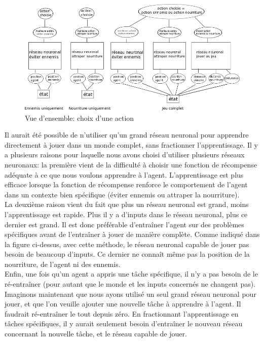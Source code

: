 \documentclass[11pt,a4paper]{report}
\begin{document}
   \begin{figure}[!h]
   \center
   \includegraphics[scale=0.6]{ressources/vue_ensemble_reseaux_agents.png}
   \caption{Vue d'ensemble: choix d'une action}
   \end{figure} 
  
  \par Il aurait été possible de n'utiliser qu'un grand réseau neuronal pour apprendre directement à jouer dans un monde complet, sans fractionner l'apprentissage. Il y a plusieurs raisons pour laquelle nous avons choisi d'utiliser plusieurs réseaux neuronaux: la première vient de la difficulté à choisir une fonction de récompense adéquate à ce que nous voulons apprendre à l'agent. L'apprentissage est plus efficace lorsque la fonction de récompense renforce le comportement de l'agent dans un contexte bien spécifique (éviter ennemis ou attraper la nourriture). \\
  La deuxième raison vient du fait que plus un réseau neuronal est grand, moins l'apprentissage est rapide. Plus il y a d'inputs dans le réseau neuronal, plus ce dernier est grand. Il est donc préférable d’entraîner l'agent sur des problèmes spécifiques avant de l’entraîner à jouer de manière complète. Comme indiqué dans la figure ci-dessus, avec cette méthode, le réseau neuronal capable de jouer pas besoin de beaucoup d'inputs. Ce dernier ne connaît même pas la position de la nourriture, de l'agent ni des ennemis. \\
  Enfin, une fois qu'un agent a appris une tâche spécifique, il n'y a pas besoin de le ré-entraîner  (pour autant que le monde et les inputs concernés ne changent pas). Imaginons maintenant que nous ayons utilisé un seul grand réseau neuronal pour jouer, et que l'on veuille ajouter une nouvelle tâche à apprendre à l'agent. Il faudrait ré-entraîner le tout depuis zéro. En fractionnant l'apprentissage en tâches spécifiques, il y aurait seulement besoin d’entraîner le nouveau réseau concernant la nouvelle tâche, et le réseau capable de jouer.  
  
\end{document}

